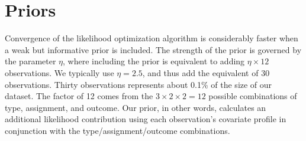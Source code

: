 \documentclass[12pt]{article}
\begin{document}


\section{Priors}

Convergence of the likelihood optimization algorithm is considerably
faster when a weak but informative prior is included.  The strength of
the prior is governed by the parameter $\eta$, where including the
prior is equivalent to adding $\eta \times 12$ observations.  We
typically use $\eta =2.5$, and thus add the equivalent of 30
observations.  Thirty observations represents about 0.1\% of the size
of our dataset.  The factor of 12 comes from the $3\times2\times2 =12$
possible combinations of type, assignment, and outcome.  Our prior, in
other words, calculates an additional likelihood contribution using
each observation's covariate profile in conjunction with the
type/assignment/outcome combinations.
\end{document}
